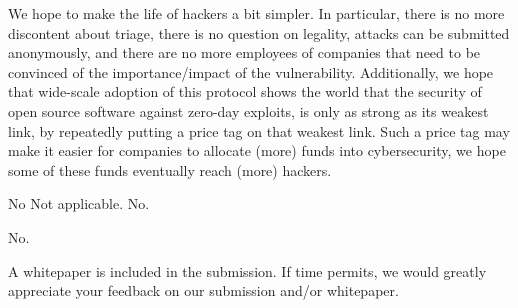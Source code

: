 \documentclass{article}
\begin{document}
%
%
%
%
We hope to make the life of hackers a bit simpler. In particular, there is no more discontent about triage, there is no question on legality, attacks can be submitted anonymously, and there are no more employees of companies that need to be convinced of the importance/impact of the vulnerability.
Additionally, we hope that wide-scale adoption of this protocol shows the world that the security of open source software against zero-day exploits, is only as strong as its weakest link, by repeatedly putting a price tag on that weakest link. Such a price tag may make it easier for companies to allocate (more) funds into cybersecurity, we hope some of these funds eventually reach (more) hackers.

No
Not applicable.
No.

No.

A whitepaper is included in the submission. If time permits, we would greatly appreciate your feedback on our submission and/or whitepaper.
\end{document}
